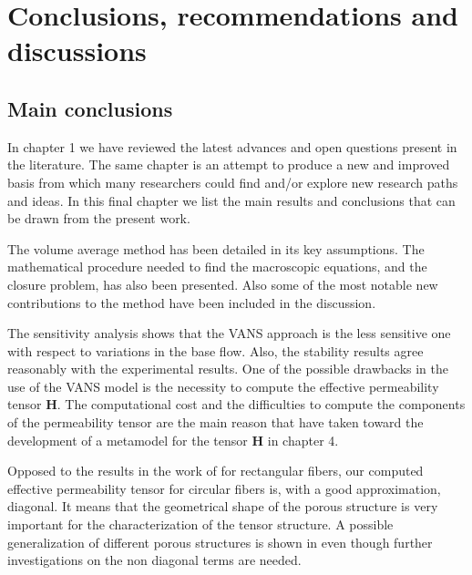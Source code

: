 \chapter{Conclusions, recommendations and discussions}


\section{Main conclusions}

In chapter 1 we have reviewed the latest advances and open questions present in the literature. The same chapter is an attempt to produce a new and improved basis from which many researchers could find and/or explore new research paths and ideas. In this final chapter we list the main results and conclusions that can be drawn from the present work.


The volume average method has been detailed in its key assumptions. The mathematical procedure needed to find the macroscopic equations, and the closure problem, has also been presented. Also some of the most notable new contributions to the method have been included in the discussion. %

 The sensitivity analysis shows that the VANS approach is the less sensitive one with respect to variations in the base flow. Also, the stability results agree reasonably with the experimental results. One of the possible drawbacks in the use of the VANS model is the necessity to compute the effective permeability tensor $\mathbf{H}$. %
The computational cost and the difficulties to compute the components of the permeability tensor are the main reason that have taken toward the development of a metamodel for the tensor $\mathbf{H}$ in chapter 4.
 
Opposed to the results in the work of \citet{lasseux} for rectangular fibers, our computed effective permeability tensor for circular fibers is, with a good approximation, diagonal. It means that the geometrical shape of the porous structure is very important for the characterization of the tensor structure. A possible generalization of different porous structures is shown in \citet{pauthenet} even though further investigations on the non diagonal terms are needed.

